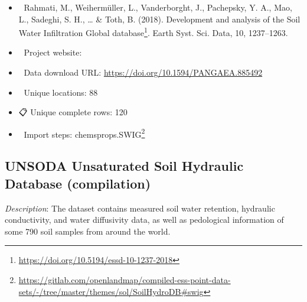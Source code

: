 \documentclass[
  graybox,natbib,nospthms]{svmono}
\providecommand{\tightlist}{%
  \setlength{\itemsep}{0pt}\setlength{\parskip}{0pt}}
\providecommand{\tightlist}{\setlength{\itemsep}{0pt}\setlength{\parskip}{0pt}}
\renewcommand{\href}[2]{#2 (\url{#1})}
\renewcommand{\href}[2]{#2\footnote{\url{#1}}}
\begin{document}
\begin{itemize}
\tightlist
\item
  📕 Rahmati, M., Weihermüller, L., Vanderborght, J., Pachepsky, Y. A.,
  Mao, L., Sadeghi, S. H., \ldots{} \& Toth, B. (2018). \href{https://doi.org/10.5194/essd-10-1237-2018}{Development and analysis of the Soil Water Infiltration Global database}. Earth Syst. Sci. Data, 10, 1237--1263.\\
\item
  🔗 Project website:\\
\item
  📂 Data download URL: \url{https://doi.org/10.1594/PANGAEA.885492}\\
\item
  📍 Unique locations: 88\\
\item
  📋 Unique complete rows: 120\\
\item
  📝 Import steps: \href{https://gitlab.com/openlandmap/compiled-ess-point-data-sets/-/tree/master/themes/sol/SoilHydroDB\#swig}{chemsprops.SWIG}
\end{itemize}

\hypertarget{unsoda-unsaturated-soil-hydraulic-database-compilation}{%
\subsection{UNSODA Unsaturated Soil Hydraulic Database (compilation)}\label{unsoda-unsaturated-soil-hydraulic-database-compilation}}

\emph{Description}: The dataset contains measured soil water retention, hydraulic conductivity, and water diffusivity data, as well as pedological information of some 790 soil samples from around the world.
\end{document}
